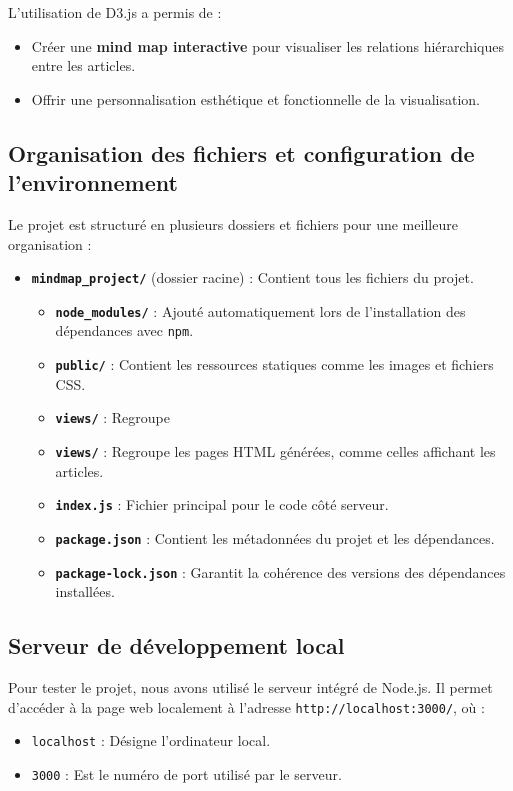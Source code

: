 \documentclass{article}
\begin{document}
L’utilisation de D3.js a permis de :
\begin{itemize}
    \item Créer une \textbf{mind map interactive} pour visualiser les relations hiérarchiques entre les articles.
    \item Offrir une personnalisation esthétique et fonctionnelle de la visualisation.
\end{itemize}

\subsection{Organisation des fichiers et configuration de l’environnement}

Le projet est structuré en plusieurs dossiers et fichiers pour une meilleure organisation :
\begin{itemize}
    \item \textbf{\texttt{mindmap\_project/}} (dossier racine) : Contient tous les fichiers du projet.
    \begin{itemize}
        \item \textbf{\texttt{node\_modules/}} : Ajouté automatiquement lors de l’installation des dépendances avec \texttt{npm}.
        \item \textbf{\texttt{public/}} : Contient les ressources statiques comme les images et fichiers CSS.
        \item \textbf{\texttt{views/}} : Regroupe
        \item \textbf{\texttt{views/}} : Regroupe les pages HTML générées, comme celles affichant les articles.
        \item \textbf{\texttt{index.js}} : Fichier principal pour le code côté serveur.
        \item \textbf{\texttt{package.json}} : Contient les métadonnées du projet et les dépendances.
        \item \textbf{\texttt{package-lock.json}} : Garantit la cohérence des versions des dépendances installées.
    \end{itemize}
\end{itemize}

\subsection{Serveur de développement local}

Pour tester le projet, nous avons utilisé le serveur intégré de Node.js. Il permet d’accéder à la page web localement à l’adresse \texttt{http://localhost:3000/}, où :
\begin{itemize}
    \item \texttt{localhost} : Désigne l’ordinateur local.
    \item \texttt{3000} : Est le numéro de port utilisé par le serveur.
\end{itemize}
\end{document}
